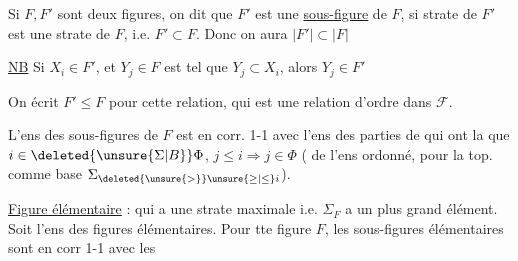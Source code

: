 Si $F,F'$ sont deux figures, on dit que $F'$ est une \uline{sous-figure} de $F$, si  strate de $F'$ est une strate de $F$, i.e. $F'\subset F$. Donc  on aura   $\lvert F'\rvert\subset\lvert F\rvert$

\uline{NB} Si $X_i\in F'$, et $Y_j\in F$ est tel que $Y_j\subset X_i$, alors $Y_j\in F'$



On écrit $F'\leq F$ pour cette relation, qui est une relation d'ordre dans $\mathcal{F}$.

L'ens des sous-figures de $F$ est en corr. 1-1 avec l'ens des parties  de   qui ont la  que  $i\in\deleted{\unsure{\Sigma|B}}\Phi$, $j\leq i\Rightarrow j\in\Phi$
(   de l'ens  ordonné, pour la top.   comme base    $\Sigma_{\deleted{\unsure{>}}\unsure{\geq|\leq}i}$).


\uline{Figure élémentaire} : qui a une strate maximale i.e. $\Sigma_F$ a un plus grand élément. Soit  l'ens des figures élémentaires.  Pour tte figure $F$, les sous-figures élémentaires sont en corr 1-1 avec les
